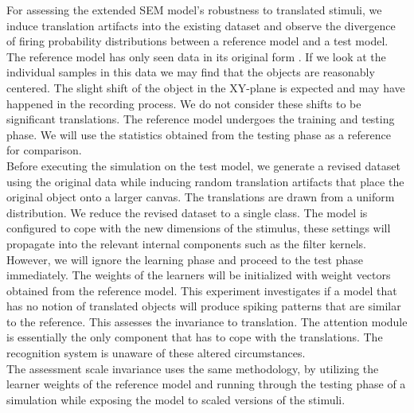 \documentclass{report}
\begin{document}
For assessing the extended SEM model's robustness to translated stimuli, we induce translation artifacts into the existing dataset and observe the divergence of firing probability distributions between a reference model and a test model. The reference model has only seen data in its original form \cite{LeCun1998}. If we look at the individual samples in this data we may find that the objects are reasonably centered. The slight shift of the object in the XY-plane is expected and may have happened in the recording process. We do not consider these shifts to be significant translations. The reference model undergoes the training and testing phase. We will use the statistics obtained from the testing phase as a reference for comparison.\\
Before executing the simulation on the test model, we generate a revised dataset using the original data while inducing random translation artifacts that place the original object onto a larger canvas. The translations are drawn from a uniform distribution. We reduce the revised dataset to a single class. The model is configured to cope with the new dimensions of the stimulus, these settings will propagate into the relevant internal components such as the filter kernels. However, we will ignore the learning phase and proceed to the test phase immediately. The weights of the learners will be initialized with weight vectors obtained from the reference model. This experiment investigates if a model that has no notion of translated objects will produce spiking patterns that are similar to the reference. This assesses the invariance to translation. The attention module is essentially the only component that has to cope with the translations. The recognition system is unaware of these altered circumstances. \\
The assessment scale invariance uses the same methodology, by utilizing the learner weights of the reference model and running through the testing phase of a simulation while exposing the model to scaled versions of the stimuli.\\
\end{document}
